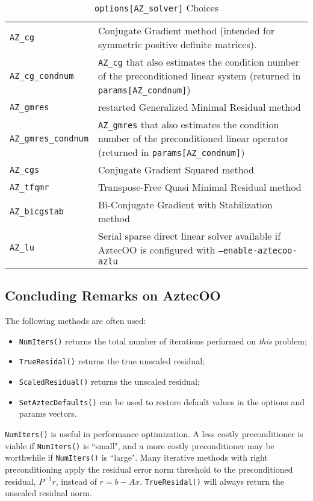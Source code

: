 \begin{table}
\begin{center}
\begin{tabular}{ | p{5cm} | p{10cm} | } \hline
\verb!AZ_cg!         & Conjugate Gradient method (intended for symmetric positive definite matrices). \\
\verb!AZ_cg_condnum! & \verb!AZ_cg! that also estimates the condition number of the preconditioned linear system
                       (returned in \verb!params[AZ_condnum]!)\\ 
\verb!AZ_gmres!      & restarted Generalized Minimal Residual method \\
\verb!AZ_gmres_condnum! & \verb!AZ_gmres! that also estimates the condition number of the preconditioned linear operator
                          (returned in \verb!params[AZ_condnum]!)\\ 
\verb!AZ_cgs! &  Conjugate Gradient Squared method\\
\verb!AZ_tfqmr! & Transpose-Free Quasi Minimal Residual method \\
\verb!AZ_bicgstab! &  Bi-Conjugate Gradient with Stabilization method\\
\verb!AZ_lu! & Serial sparse direct linear solver available if
               AztecOO is configured with {\tt --enable-aztecoo-azlu}\\
\hline \end{tabular}
\caption{ {\tt options[AZ\_solver]} Choices}
\label{tab:aztec:solver}
\end{center}
\end{table}


\subsection{Concluding Remarks on AztecOO}

The following methods are often used:
\begin{itemize}
\item \verb!NumIters()! returns the total number of iterations performed
  on {\sl this} problem;
\item \verb!TrueResidal()! returns the true unscaled residual;
\item \verb!ScaledResidual()! returns the unscaled residual;
\item \verb!SetAztecDefaults()! can be used to restore default values in
  the options and params vectors.
\end{itemize}
\verb!NumIters()! is useful in performance optimization.
A less costly preconditioner is viable if \verb!NumIters()! is ``small", 
and a more costly preconditioner may be worthwhile if \verb!NumIters()! is ``large".
Many iterative methods with right preconditioning 
apply the residual error norm threshold to the preconditioned residual,
$P^{-1}r$, instead of $r=b-Ax$.
\verb!TrueResidal()! will always return the unscaled residual norm.
